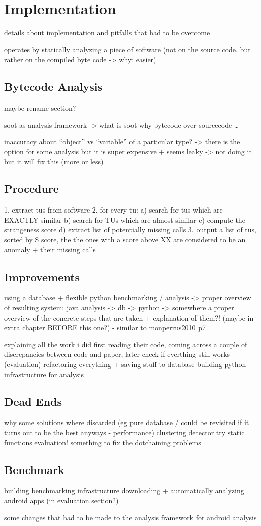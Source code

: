 \chapter{Implementation}
details about implementation and pitfalls that had to be overcome

operates by statically analyzing a piece of software
(not on the source code, but rather on the compiled byte code -> why: easier)

\section{Bytecode Analysis}\label{sec:bytecode}
maybe rename section?

soot as analysis framework -> what is soot
why bytecode over sourcecode
\ldots

inaccuracy about ``object'' vs ``variable'' of a particular type?
-> there is the option for some analysis but it is super  expensive + seems leaky -> not doing it
but it will fix this (more or less)

\section{Procedure}

1. extract tus from software
2. for every tu:
    a) search for tus which are EXACTLY similar
    b) search for TUs which are almost similar
    c) compute the strangeness score
    d) extract list of potentially missing calls
3. output a list of tus, sorted by S score, the the ones with a score above XX are considered to be an anomaly + their missing calls

\section{Improvements}
using a database + flexible python benchmarking / analysis
-> proper overview of resulting system: java analysis -> db -> python
-> somewhere a proper overview of the concrete steps that are taken + explanation of them?! (maybe in extra chapter BEFORE this one?) - similar to monperrus2010 p7

explaining all the work i did
    first reading their code, coming across a couple of discrepancies between code and paper, later check if everthing still works (evaluation)
    refactoring everything + saving stuff to database
    building python infrastructure for analysis

\section{Dead Ends}
why some solutions where discarded (eg pure database / could be revisited if it turns out to be the best anyways - performance)
    clustering detector try
static functions evaluation!
something to fix the dotchaining problems

\section{Benchmark}

building benchmarking infrastructure
downloading + automatically analyzing android apps (in evaluation section?)

some changes that had to be made to the analysis framework for android analysis

